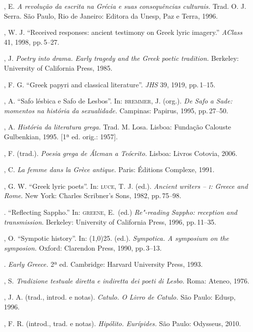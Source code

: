\begin{bibliohedra}
, E. \textit{A revolução da escrita na Grécia e suas
consequências culturais.} Trad. O. J. Serra. São Paulo, Rio de Janeiro: Editora
da Unesp, Paz e Terra, 1996.

, W. J. ``Received responses: ancient testimony on Greek lyric imagery.'' 
\textit{AClass} 41, 1998, pp.\,5--27. 

, J. \textit{Poetry into drama. Early tragedy and the Greek
poetic tradition.} Berkeley: University of California Press, 1985.

, F. G. “Greek papyri and classical literature”.
\textit{JHS} 39, 1919, pp.\,1--15.

, A. “Safo lésbica e Safo de Lesbos”. In: \textsc{bremmer}, J.
(org.). \textit{De Safo a Sade: momentos na história da sexualidade.} Campinas:
Papirus, 1995, pp.\,27--50.

, A. \textit{História da literatura grega.} Trad. M. Losa. Lisboa:
Fundação Calouste Gulbenkian, 1995. {[}1ª ed. orig.: 1957{]}.

, F. (trad.). \textit{Poesia grega de Álcman a Teócrito.}
Lisboa: Livros Cotovia, 2006.

, C. \textit{La femme dans la Grèce antique.} Paris: Éditions
Complexe, 1991.

, G. W. “Greek lyric poets”. In: \textsc{luce}, T. J. (ed.). \textit{Ancient writers -- \textsc{i}: Greece and Rome}. New York: Charles Scribner's Sons, 1982, pp.\,75--98. 

\titidem. ``Reflecting Sappho.'' In: \textsc{greene}, E.~(ed.) 
\textit{Re"-reading Sappho: reception and transmission}. Berkeley: University of California Press,
1996, pp.\,11--35.

, O. “Sympotic history”. In: \line(1,0){25}. (ed.).
\textit{Sympotica. A symposium on the symposion.} Oxford: Clarendon Press,
1990, pp.\,3--13.

\titidem. \textit{Early Greece.} 2ª ed.
Cambridge: Harvard University Press, 1993.

, S. \textit{Tradizione testuale diretta e indiretta dei poeti
di Lesbo.} Roma: Ateneo, 1976. 

, J. A. (trad., introd. e notas). \textit{Catulo. O Livro de
Catulo.} São Paulo: Edusp, 1996.

, F. R. (introd., trad. e notas). \textit{Hipólito. Eurípides.}
São Paulo: Odysseus, 2010.


\end{bibliohedra}
